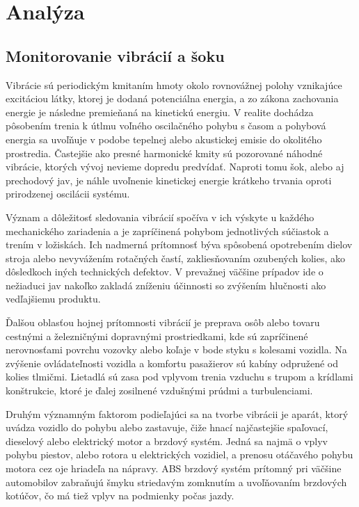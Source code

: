 \chapter{Analýza}

\section{Monitorovanie vibrácií a šoku}
Vibrácie sú periodickým kmitaním hmoty okolo rovnovážnej polohy vznikajúce excitáciou látky, ktorej je dodaná potenciálna energia, a zo
zákona zachovania energie je následne premieňaná na kinetickú energiu. V realite dochádza pôsobením trenia k útlmu voľného oscilačného
pohybu s časom  a pohybová energia sa uvoľňuje v podobe tepelnej alebo akustickej emisie do okolitého prostredia. Častejšie ako presné
harmonické kmity sú pozorované náhodné vibrácie, ktorých vývoj nevieme dopredu predvídať. Naproti tomu šok, alebo aj prechodový jav, je
náhle uvoľnenie kinetickej energie krátkeho trvania oproti prirodzenej oscilácii systému.

Význam a dôležitosť sledovania vibrácií spočíva v ich výskyte u každého mechanického zariadenia a je zapríčinená pohybom jednotlivých
súčiastok a trením v ložiskách. Ich nadmerná prítomnosť býva spôsobená opotrebením dielov stroja alebo nevyvážením rotačných častí,
zakliesňovaním ozubených kolies, ako dôsledkoch iných technických defektov. V prevažnej väčšine prípadov ide o nežiaduci jav nakoľko
zakladá zníženiu účinnosti so zvýšením hlučnosti ako vedľajšiemu produktu.

Ďalšou oblasťou hojnej prítomnosti vibrácií je preprava osôb alebo tovaru cestnými a železničnými dopravnými prostriedkami, kde sú
zapríčinené nerovnosťami povrchu vozovky alebo koľaje v bode styku s kolesami vozidla. Na zvýšenie ovládateľnosti vozidla a komfortu
pasažierov sú kabíny odpružené od kolies tlmičmi. Lietadlá sú zasa pod vplyvom trenia vzduchu s trupom a krídlami konštrukcie, ktoré je
ďalej zosilnené vzdušnými prúdmi a turbulenciami.

Druhým významným faktorom podieľajúci sa na tvorbe vibrácii je aparát, ktorý uvádza vozidlo do pohybu alebo zastavuje, čiže hnací
najčastejšie spaľovací, dieselový alebo elektrický motor a brzdový systém. Jedná sa najmä o vplyv pohybu piestov, alebo rotora u
elektrických vozidiel, a prenosu otáčavého pohybu motora cez oje hriadeľa na nápravy. ABS brzdový systém prítomný pri väčšine
automobilov zabraňujú šmyku striedavým zomknutím a uvoľňovaním brzdových kotúčov, čo má tiež vplyv na podmienky počas jazdy.

